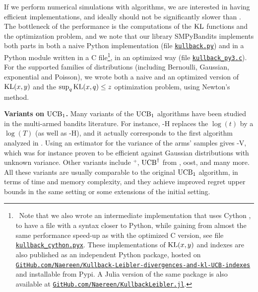 If we perform numerical simulations with \klUCB{} algorithms, we are interested in having efficient implementations, and ideally \klUCB{} should not be significantly slower than \UCB. The bottleneck of the performance is the computations of the $\mathrm{KL}$ functions and the optimization problem,
and we note that our library SMPyBandits implements both parts in both a naive Python implementation (file \href{https://github.com/SMPyBandits/SMPyBandits/blob/master/SMPyBandits/Policies/kullback.py}{\texttt{kullback.py}}) and in a Python module written in a
C file\footnote{~Note that we also wrote an intermediate implementation that uses Cython \cite{cython}, to have a file with a syntax closer to Python, while gaining from almost the same performance speed-up as with the optimized C version, see file \href{https://github.com/SMPyBandits/SMPyBandits/blob/master/SMPyBandits/Policies/kullback_cython.pyx}{\texttt{kullback\_cython.pyx}}.
    These implementations of $\mathrm{KL}(x,y)$ and \klUCB{} indexes are also published as an independent Python package, hosted on \href{https://github.com/Naereen/Kullback-Leibler-divergences-and-kl-UCB-indexes}{\texttt{GitHub.com/Naereen/Kullback-Leibler-divergences-and-kl-UCB-indexes}} and installable from Pypi.
    A Julia version of the same package is also available at \href{https://github.com/Naereen/KullbackLeibler.jl}{\texttt{GitHub.com/Naereen/KullbackLeibler.jl}}.
},
in an optimized way (file \href{https://github.com/SMPyBandits/SMPyBandits/blob/master/SMPyBandits/Policies/C/kullback_py3.c}{\texttt{kullback\_py3.c}}).
For the supported families of distributions (including Bernoulli, Gaussian, exponential and Poisson), we wrote both a naive and an optimized version of $\mathrm{KL}(x,y)$ and the $\sup_q \mathrm{KL}(x,q) \leq z$ optimization problem, using Newton's method.


\textbf{Variants on $\mathrm{UCB}_1$.}
%
Many variants of the $\mathrm{UCB}_1$ algorithms have been studied in the multi-armed bandits literature.
For instance, \UCB-H replaces the $\log(t)$ by a $\log(T)$ (as well as \klUCB-H), and it actually corresponds to the first algorithm analyzed in \cite{Auer02}.
Using an estimator for the variance of the arms' samples gives \UCB-V, which was for instance proven to be efficient against Gaussian distributions with unknown variance.
Other variants include \UCB$^+$, $\mathrm{UCB}^{\dagger}$ from \cite{Lattimore2018refining}, {\UCB}oost, and many more.
%
All these variants are usually comparable to the original $\mathrm{UCB}_1$ algorithm, in terms of time and memory complexity, and they achieve improved regret upper bounds in the same setting or some extensions of the initial setting.


